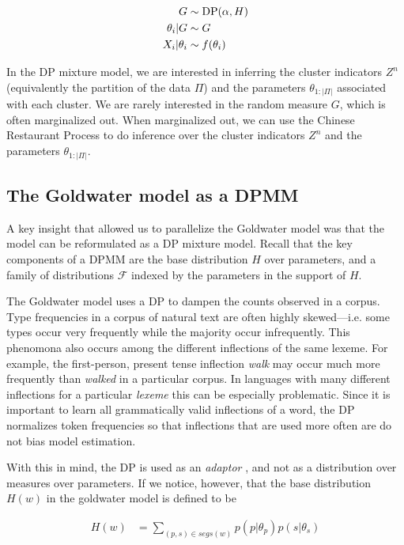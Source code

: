 \begin{align}
  G &\sim \mathrm{DP}(\alpha, H) \\ \theta_i|G &\sim G \\ X_i|\theta_i &\sim f(\theta_i)
\end{align}

In the DP mixture model, we are interested in inferring the cluster
indicators $Z^n$ (equivalently the partition of the data $\Pi$) and
the parameters $\theta_{1:|\Pi|}$ associated with each cluster. We are
rarely interested in the random measure $G$, which is often
marginalized out. When marginalized out, we can use the Chinese
Restaurant Process to do inference over the cluster indicators $Z^n$
and the parameters $\theta_{1:|\Pi|}$.

\subsection{The Goldwater model as a DPMM}

A key insight that allowed us to parallelize the Goldwater model was
that the model can be reformulated as a DP mixture model. Recall that
the key components of a DPMM are the base distribution $H$ over
parameters, and a family of distributions $\mathcal{F}$ indexed by the
parameters in the support of $H$.

The Goldwater model uses a DP to dampen the counts observed in a
corpus. Type frequencies in a corpus of natural text are often highly
skewed---i.e. some types occur very frequently while the majority
occur infrequently. This phenomona also occurs among the different
inflections of the same lexeme. For example, the first-person, present
tense inflection \textit{walk} may occur much more frequently than
\textit{walked} in a particular corpus. In languages with many
different inflections for a particular \textit{lexeme} this can be
especially problematic. Since it is important to learn all
grammatically valid inflections of a word, the DP normalizes token
frequencies so that inflections that are used more often are do not
bias model estimation.

With this in mind, the DP is used as an \textit{adaptor}
\cite{goldwater2011}, and not as a distribution over measures over
parameters. If we notice, however, that the base distribution $H(w)$
in the goldwater model is defined to be

\begin{align*}
  H(w) &= \sum_{(p,s) \in segs(w)} p(p | \theta_p) p(s | \theta_s)
\end{align*}

